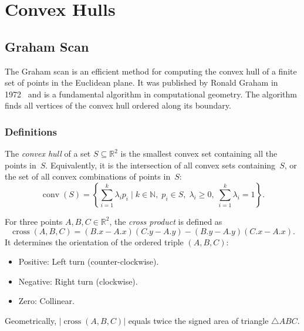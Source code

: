 \chapter{Convex Hulls}
\label{ch:convex_hulls}

\section{Graham Scan}
\label{sec:graham_scan}

The Graham scan is an efficient method for computing the convex hull of a finite set of points in the Euclidean plane. It was published by Ronald Graham in 1972~\cite{graham1972} and is a fundamental algorithm in computational geometry. The algorithm finds all vertices of the convex hull ordered along its boundary.

\subsection{Definitions}

\begin{definition}\label{def:convex_hull}
The \emph{convex hull} of a set $S \subseteq \mathbb{R}^2$ is the smallest convex set containing all the points in~$S$. Equivalently, it is the intersection of all convex sets containing~$S$, or the set of all convex combinations of points in~$S$:
\[
\operatorname{conv}(S) = \left\{ \sum_{i=1}^{k} \lambda_i p_i \;\Big|\; k \in \mathbb{N},\; p_i \in S,\; \lambda_i \ge 0,\; \sum_{i=1}^{k} \lambda_i = 1 \right\}.
\]
\end{definition}

\begin{definition}\label{def:cross_product_2d}
For three points $A, B, C \in \mathbb{R}^2$, the \emph{cross product} is defined as
\[
\operatorname{cross}(A, B, C) = (B.x - A.x)(C.y - A.y) - (B.y - A.y)(C.x - A.x).
\]
It determines the orientation of the ordered triple $(A, B, C)$:
\begin{itemize}
\item Positive: Left turn (counter-clockwise).
\item Negative: Right turn (clockwise).
\item Zero: Collinear.
\end{itemize}
Geometrically, $|\operatorname{cross}(A,B,C)|$ equals twice the signed area of triangle $\triangle ABC$.
\end{definition}

